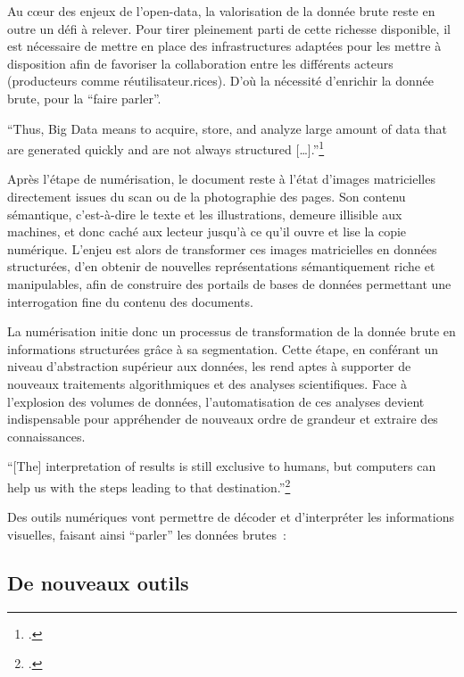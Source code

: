 Au cœur des enjeux de l'open-data, la valorisation de la donnée brute reste en outre un défi à relever. Pour tirer pleinement parti de cette richesse disponible, il est nécessaire de mettre en place des infrastructures adaptées pour les mettre à disposition afin de favoriser la collaboration entre les différents acteurs (producteurs comme réutilisateur.rices). D'où la nécessité d'enrichir la donnée brute, pour la ``faire parler''. 

\begin{kwote}
``Thus, Big Data means to acquire, store, and analyze large amount of data that are generated quickly and are not always structured {[}\ldots{]}.''\footcite[p.26]{klinke_big_2016}
\end{kwote}

Après l'étape de numérisation, le document reste à l'état d'images matricielles directement issues du scan ou de la photographie des pages. Son contenu sémantique, c'est-à-dire le texte et les illustrations, demeure illisible aux machines, et donc caché aux lecteur jusqu'à ce qu'il ouvre et lise la copie numérique. L'enjeu est alors de transformer ces images matricielles en données structurées, d'en obtenir de nouvelles représentations sémantiquement riche et manipulables, afin de construire des portails de bases de données permettant une interrogation fine du contenu des documents. 

La numérisation initie donc un processus de transformation de la donnée brute en informations structurées grâce à sa segmentation. Cette étape, en conférant un niveau d'abstraction supérieur aux données, les rend aptes à supporter de nouveaux traitements algorithmiques et des analyses scientifiques. Face à l'explosion des volumes de données, l'automatisation de ces analyses devient indispensable pour appréhender de nouveaux ordre de grandeur et extraire des connaissances.

\begin{kwote}
``[The] interpretation of results is still exclusive to humans, but computers can help us with the steps leading to that destination.''\footcite[p.26]{klinke_big_2016}
\end{kwote}

Des outils numériques vont permettre de décoder et d'interpréter les informations visuelles, faisant ainsi ``parler'' les données brutes~:

\subsection{De nouveaux outils}


